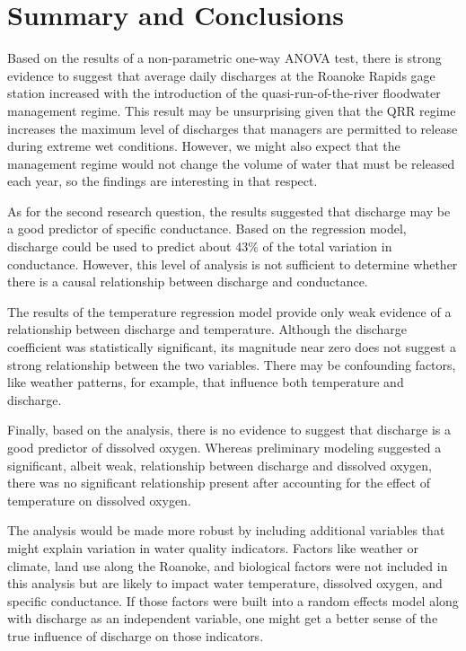 \documentclass[12pt,]{article}
\begin{document}
\hypertarget{summary-and-conclusions}{%
\section{Summary and Conclusions}\label{summary-and-conclusions}}

Based on the results of a non-parametric one-way ANOVA test, there is
strong evidence to suggest that average daily discharges at the Roanoke
Rapids gage station increased with the introduction of the
quasi-run-of-the-river floodwater management regime. This result may be
unsurprising given that the QRR regime increases the maximum level of
discharges that managers are permitted to release during extreme wet
conditions. However, we might also expect that the management regime
would not change the volume of water that must be released each year, so
the findings are interesting in that respect.

As for the second research question, the results suggested that
discharge may be a good predictor of specific conductance. Based on the
regression model, discharge could be used to predict about 43\% of the
total variation in conductance. However, this level of analysis is not
sufficient to determine whether there is a causal relationship between
discharge and conductance.

The results of the temperature regression model provide only weak
evidence of a relationship between discharge and temperature. Although
the discharge coefficient was statistically significant, its magnitude
near zero does not suggest a strong relationship between the two
variables. There may be confounding factors, like weather patterns, for
example, that influence both temperature and discharge.

Finally, based on the analysis, there is no evidence to suggest that
discharge is a good predictor of dissolved oxygen. Whereas preliminary
modeling suggested a significant, albeit weak, relationship between
discharge and dissolved oxygen, there was no significant relationship
present after accounting for the effect of temperature on dissolved
oxygen.

The analysis would be made more robust by including additional variables
that might explain variation in water quality indicators. Factors like
weather or climate, land use along the Roanoke, and biological factors
were not included in this analysis but are likely to impact water
temperature, dissolved oxygen, and specific conductance. If those
factors were built into a random effects model along with discharge as
an independent variable, one might get a better sense of the true
influence of discharge on those indicators.
\end{document}
